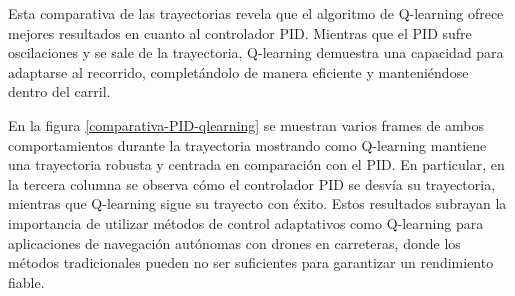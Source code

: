 Esta comparativa de las trayectorias revela que el algoritmo de Q-learning ofrece mejores resultados en cuanto al controlador PID. Mientras que el PID sufre oscilaciones y se sale de la trayectoria,
Q-learning demuestra una capacidad para adaptarse al recorrido, completándolo de manera eficiente y manteniéndose dentro del carril.



En la figura \ref{comparativa-PID-qlearning} se muestran varios frames de ambos comportamientos durante la trayectoria mostrando como Q-learning mantiene una trayectoria robusta y centrada 
en comparación con el PID. En particular, en la tercera columna se observa cómo el controlador PID se desvía su trayectoria, mientras que Q-learning sigue su trayecto con éxito. 
Estos resultados subrayan la importancia de utilizar métodos de control adaptativos como Q-learning para aplicaciones de navegación autónomas con drones en carreteras, donde los métodos 
tradicionales pueden no ser suficientes para garantizar un rendimiento fiable. 

